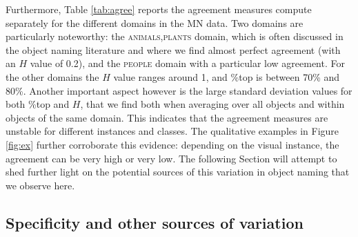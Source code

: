 Furthermore, Table \ref{tab:agree} reports the agreement measures compute separately for the different domains in the MN data.
Two domains are particularly noteworthy: the \textsc{animals,plants} domain, which is often discussed in the object naming literature and where we find almost perfect agreement (with an $H$ value of 0.2), and the \textsc{people} domain with a particular low agreement.
For the other domains the $H$ value ranges around 1, and \%top is between 70\% and 80\%.
Another important aspect however is the large standard deviation values for both \%top and $H$, that we find both when averaging over all objects and within objects of the same domain. This indicates that the agreement measures are unstable for different instances and classes.
The qualitative examples in Figure \ref{fig:ex} further corroborate this evidence: depending on the visual instance, the agreement can be very high or very low.
The following Section will attempt to shed further light on the potential sources of this variation in object naming that we observe here.


\subsection{Specificity and other sources of variation}

